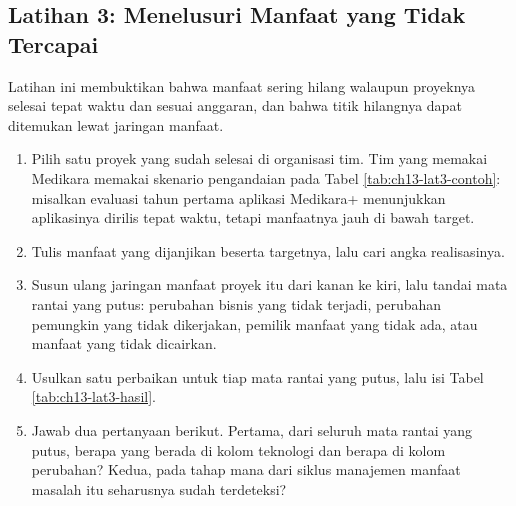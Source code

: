 \subsection*{Latihan 3: Menelusuri Manfaat yang Tidak Tercapai}

Latihan ini membuktikan bahwa manfaat sering hilang walaupun proyeknya
selesai tepat waktu dan sesuai anggaran, dan bahwa titik hilangnya dapat
ditemukan lewat jaringan manfaat.

\begin{enumerate}
  \item Pilih satu proyek yang sudah selesai di organisasi tim. Tim yang
        memakai Medikara memakai skenario pengandaian pada Tabel
        \ref{tab:ch13-lat3-contoh}: misalkan evaluasi tahun pertama aplikasi
        Medikara+ menunjukkan aplikasinya dirilis tepat waktu, tetapi
        manfaatnya jauh di bawah target.
  \item Tulis manfaat yang dijanjikan beserta targetnya, lalu cari angka
        realisasinya.
  \item Susun ulang jaringan manfaat proyek itu dari kanan ke kiri, lalu
        tandai mata rantai yang putus: perubahan bisnis yang tidak terjadi,
        perubahan pemungkin yang tidak dikerjakan, pemilik manfaat yang tidak
        ada, atau manfaat yang tidak dicairkan.
  \item Usulkan satu perbaikan untuk tiap mata rantai yang putus, lalu isi
        Tabel \ref{tab:ch13-lat3-hasil}.
  \item Jawab dua pertanyaan berikut. Pertama, dari seluruh mata rantai yang
        putus, berapa yang berada di kolom teknologi dan berapa di kolom
        perubahan? Kedua, pada tahap mana dari siklus manajemen manfaat
        masalah itu seharusnya sudah terdeteksi?
\end{enumerate}


